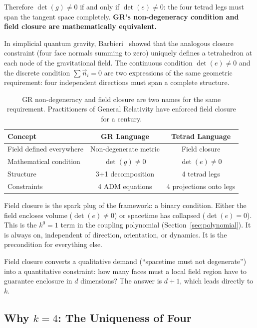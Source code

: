 \documentclass[aps,prd,preprint,superscriptaddress,showpacs,preprintnumbers,amsmath,amssymb,nofootinbib]{revtex4-2}
\begin{document}
Therefore $\det(g) \neq 0$ if and only if $\det(e) \neq 0$: the four tetrad legs must span the tangent space completely. \textbf{GR's non-degeneracy condition and field closure are mathematically equivalent.}

In simplicial quantum gravity, Barbieri~\cite{barbieri1998} showed that the analogous closure constraint (four face normals summing to zero) uniquely defines a tetrahedron at each node of the gravitational field. The continuous condition $\det(e) \neq 0$ and the discrete condition $\sum \vec{n}_i = 0$ are two expressions of the same geometric requirement: four independent directions must span a complete structure.

\begin{table}[H]
\centering
\begin{tabular*}{0.95\textwidth}{@{\extracolsep{\fill}} lcc @{}}
\toprule
\textbf{Concept} & \textbf{GR Language} & \textbf{Tetrad Language} \\
\midrule
Field defined everywhere & Non-degenerate metric & Field closure \\
Mathematical condition & $\det(g) \neq 0$ & $\det(e) \neq 0$ \\
Structure & 3+1 decomposition & 4 tetrad legs \\
Constraints & 4 ADM equations & 4 projections onto legs \\
\bottomrule
\end{tabular*}
\caption{GR non-degeneracy and field closure are two names for the same requirement. Practitioners of General Relativity have enforced field closure for a century.}
\label{tab:closure}
\end{table}

Field closure is the spark plug of the framework: a binary condition. Either the field encloses volume ($\det(e) \neq 0$) or spacetime has collapsed ($\det(e) = 0$). This is the $k^0 = 1$ term in the coupling polynomial (Section~\ref{sec:polynomial}). It is always on, independent of direction, orientation, or dynamics. It is the precondition for everything else.

Field closure converts a qualitative demand (``spacetime must not degenerate'') into a quantitative constraint: how many faces must a local field region have to guarantee enclosure in $d$ dimensions? The answer is $d + 1$, which leads directly to $k$.

\subsection{Why $k = 4$: The Uniqueness of Four}
\label{subsec:k4}
\end{document}
